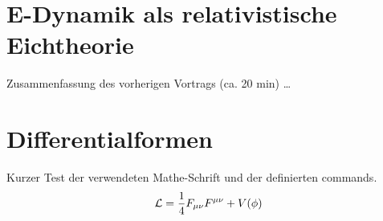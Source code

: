 \section{E-Dynamik als relativistische Eichtheorie}

Zusammenfassung des vorherigen Vortrags (ca. 20 min) \dots

\section{Differentialformen}

Kurzer Test der verwendeten Mathe-Schrift und der definierten commands.
\begin{align}
\mathcal{L} = \frac{1}{4} F_{\mu \nu} F^{\mu \nu} + V(\phi)
\end{align}
